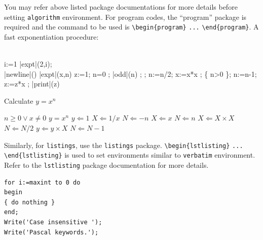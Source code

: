 \documentclass[sn-mathphys]{sn-jnl}%
\begin{document}
You may refer above listed package documentations for more details before setting \verb+algorithm+ environment. For program codes, the ``program'' package is required and the command to be used is \verb+\begin{program}+ \verb+...+ \verb+\end{program}+. A fast exponentiation procedure:

\begin{program}
\BEGIN \\ %
  \FOR i:=1   \DO
     |expt|(2,i); \\ |newline|() \OD %
\WHERE
\PROC |expt|(x,n) \BODY
          z:=1;
          \DO \IF n=0 \THEN \EXIT \FI;
             \DO \IF |odd|(n) \THEN \EXIT \FI;
;
                n:=n/2; x:=x*x \OD;
             \{ n>0 \};
             n:=n-1; z:=z*x \OD;
          |print|(z) \ENDPROC
\END
\end{program}


\begin{algorithm}
\caption{Calculate $y = x^n$}\label{algo1}
\begin{algorithmic}[1]
\Require $n \geq 0 \vee x \neq 0$
\Ensure $y = x^n$ 
\State $y \Leftarrow 1$
\label{algln2}
        \State $X \Leftarrow 1 / x$
        \State $N \Leftarrow -n$
\Else
        \State $X \Leftarrow x$
        \State $N \Leftarrow n$
\EndIf
{}
            \State $X \Leftarrow X \times X$
            \State $N \Leftarrow N / 2$
        \Else[$N$ is odd]
            \State $y \Leftarrow y \times X$
            \State $N \Leftarrow N - 1$
        \EndIf
\EndWhile
\end{algorithmic}
\end{algorithm}
\bigskip

Similarly, for \verb+listings+, use the \verb+listings+ package. \verb+\begin{lstlisting}+ \verb+...+ \verb+\end{lstlisting}+ is used to set environments similar to \verb+verbatim+ environment. Refer to the \verb+lstlisting+ package documentation for more details.

\bigskip
\begin{minipage}{\hsize}%
\lstset{frame=single,framexleftmargin=-1pt,framexrightmargin=-17pt,framesep=12pt,linewidth=0.98\textwidth,language=pascal}%
\begin{lstlisting}
for i:=maxint to 0 do
begin
{ do nothing }
end;
Write('Case insensitive ');
Write('Pascal keywords.');
\end{lstlisting}
\end{minipage}
\end{document}
